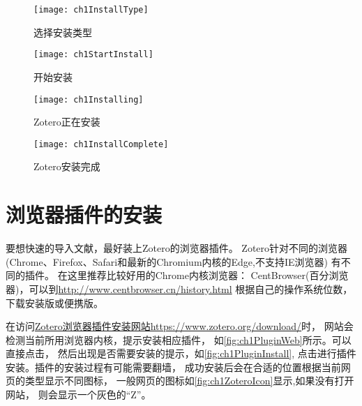 \documentclass[theorem=false,mathfont=none,openany,sub3section]{easybook}
\begin{document}
\begin{figure}[htbp]
  \centering
  \begin{minipage}[t]{\dimexpr0.5\textwidth-4em}
    \centering
    \texttt{[image: ch1InstallType]}
    \caption{选择安装类型}
    \label{fig:installType}
  \end{minipage}
  \hspace{1cm}
  \centering
  \begin{minipage}[t]{\dimexpr0.5\textwidth-4em}
    \centering
    \texttt{[image: ch1StartInstall]}
    \caption{开始安装}
    \label{fig:ch1StartInstall}
  \end{minipage}
\end{figure}

\begin{figure}[htbp]
  \noindent
  \centering
  \begin{minipage}[t]{\dimexpr0.5\textwidth-4em}
    \centering
    \texttt{[image: ch1Installing]}
    \caption{Zotero正在安装}
    \label{fig:ch1Installing}
  \end{minipage}
  \hspace{1cm}
  \noindent
  \begin{minipage}[t]{\dimexpr0.5\textwidth-4em}
    \centering
    \texttt{[image: ch1InstallComplete]}
    \caption{Zotero安装完成}
    \label{fig:ch1InstallComplete}
  \end{minipage}
\end{figure}

\section{浏览器插件的安装}
要想快速的导入文献，最好装上Zotero的浏览器插件。
Zotero针对不同的浏览器(Chrome、Firefox、Safari和最新的Chromium内核的Edge,不支持IE浏览器)
有不同的插件。	在这里推荐比较好用的Chrome内核浏览器：
CentBrowser(百分浏览器)，可以到\url{http://www.centbrowser.cn/history.html}
根据自己的操作系统位数，下载安装版或便携版。

在访问\href{https://www.zotero.org/download/}
{Zotero浏览器插件安装网站https://www.zotero.org/download/}时，
网站会检测当前所用浏览器内核，提示安装相应插件，
如\autoref{fig:ch1PluginWeb}所示。可以直接点击，
然后出现是否需要安装的提示，如\autoref{fig:ch1PluginInstall},
点击进行插件安装。插件的安装过程有可能需要翻墙，
成功安装后会在合适的位置根据当前网页的类型显示不同图标，
一般网页的图标如\autoref{fig:ch1ZoteroIcon}显示,如果没有打开网站，
则会显示一个灰色的“Z”。
\end{document}
